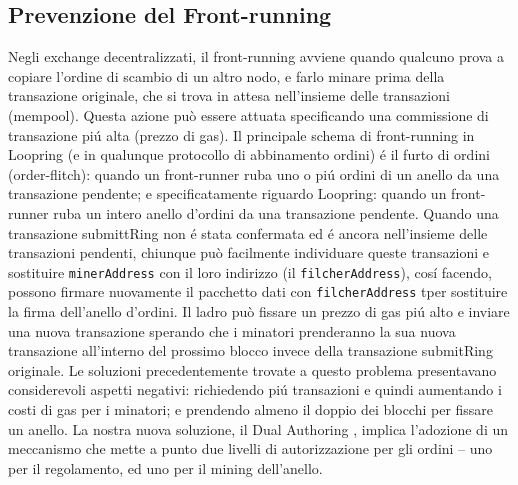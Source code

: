 \documentclass[UTF8,nofonts]{article}
\begin{document}
\begin{multicols}{2}
\subsection{Prevenzione del Front-running\label{sec:dual_authoring}}
Negli exchange decentralizzati, il front-running avviene quando qualcuno prova a copiare l'ordine di scambio di un altro nodo, e farlo minare prima della transazione originale, che si trova in attesa nell'insieme delle transazioni (mempool). Questa azione può essere attuata specificando una commissione di transazione pi\'u alta (prezzo di gas). Il principale schema di front-running in Loopring (e in qualunque protocollo di abbinamento ordini) \'e il furto di ordini (order-flitch): quando un front-runner ruba uno o pi\'u ordini di un anello da una transazione pendente; e specificatamente riguardo Loopring: quando un front-runner ruba un intero anello d'ordini da una transazione pendente.
Quando una transazione submittRing non \'e stata confermata ed \'e ancora nell'insieme delle transazioni pendenti, chiunque può facilmente individuare queste transazioni e sostituire \verb|minerAddress| con il loro  indirizzo (il \verb|filcherAddress|), cos\'i facendo, possono firmare nuovamente il pacchetto dati con \verb|filcherAddress| tper sostituire la firma dell'anello d'ordini. Il ladro può fissare un prezzo di gas pi\'u alto e inviare una nuova transazione sperando che i minatori prenderanno la sua nuova transazione all'interno del prossimo blocco invece della transazione submitRing originale.
Le soluzioni precedentemente trovate a questo problema presentavano considerevoli aspetti negativi: richiedendo pi\'u transazioni e quindi aumentando i costi di gas per i minatori;  e prendendo almeno il doppio dei blocchi per fissare un anello. La nostra nuova soluzione, il Dual Authoring \cite{dualauthor}, implica l'adozione di un meccanismo che mette a punto due livelli di autorizzazione per gli ordini – uno per il regolamento, ed uno per il mining dell'anello.


\end{multicols}
\end{document}
